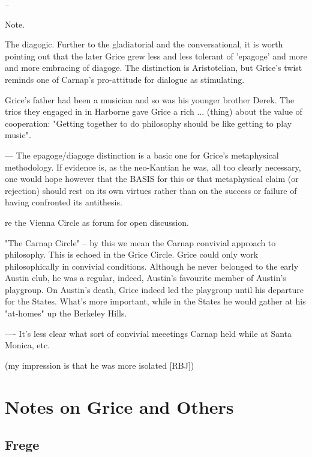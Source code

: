 \documentclass[10pt,titlepage]{book}
\begin{document}
--
 
Note.

The diagogic. Further to the gladiatorial and the conversational, it is  
worth pointing out that the later Grice grew less and less tolerant of 
'epagoge'  and more and more embracing of diagoge. The distinction is Aristotelian, 
but  Grice's twist reminds one of Carnap's pro-attitude for dialogue as  
stimulating.
 
Grice's father had been a musician and so was his younger brother Derek.  
The trios they engaged in in Harborne gave Grice a rich ... (thing) about the 
 value of cooperation: "Getting together to do philosophy should be like 
getting  to play music".
 
---
The epagoge/diagoge distinction is a basic one for Grice's metaphysical  
methodology. If evidence is, as the neo-Kantian he was, all too clearly  
necessary, one would hope however that the BASIS for this or that metaphysical  
claim (or rejection) should rest on its own virtues rather than on the 
success  or failure of having confronted its antithesis.
  
re the Vienna Circle as forum for open discussion.
 
"The Carnap Circle" -- by this we mean the Carnap convivial approach to  
philosophy. This is echoed in the Grice Circle. Grice could only work  
philosophically in convivial conditions. Although he never belonged to the early  
Austin club, he was a regular, indeed, Austin's favourite member of Austin's  
playgroup. On Austin's death, Grice indeed led the playgroup until his 
departure  for the States. What's more important, while in the States he would 
gather at  his "at-homes" up the Berkeley Hills.
 
---- It's less clear what sort of convivial meeetings Carnap held while at  
Santa Monica, etc.

(my impression is that he was more isolated [RBJ])

\chapter{Notes on Grice and Others}

\section{Frege}
\end{document}
